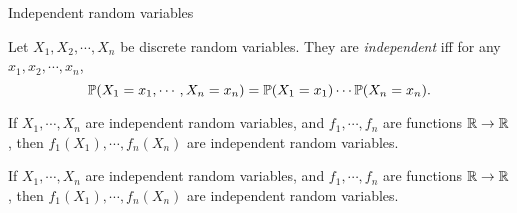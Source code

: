 %
\begin{note}
  \begin{field}
    Independent random variables
  \end{field}
  \begin{field}
    \begin{defi}
      Let $X_1, X_2, \cdots, X_n$ be discrete random variables. They are \emph{independent} iff for any $x_1, x_2, \cdots, x_n$,
      \[
        \P(X_1 = x_1, \cdots, X_n = x_n) = \P(X_1 = x_1)\cdots \P(X_n = x_n).
      \]
    \end{defi}
  \end{field}
  \xplain{}%
\end{note}

\begin{note}
  \begin{field}
    \begin{thm}
      If $X_1, \cdots, X_n$ are independent random variables, and $f_1, \cdots, f_n$ are functions $\R \to \R$, then $f_1(X_1), \cdots, f_n(X_n)$ are independent random variables.
    \end{thm}
  \end{field}
  \begin{field}
    \begin{thm}
      If $X_1, \cdots, X_n$ are independent random variables, and $f_1, \cdots, f_n$ are functions $\R \to \R$, then $f_1(X_1), \cdots, f_n(X_n)$ are independent random variables.
    \end{thm}
  \end{field}
  \xplain{}%
\end{note}


